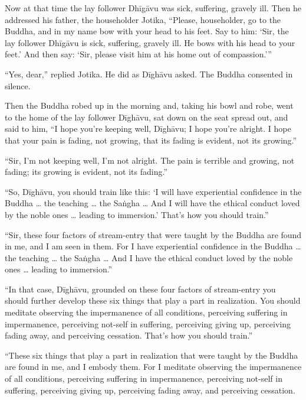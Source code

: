 \documentclass[12pt,openany]{book}%
\begin{document}
Now at that time the lay follower \textsanskrit{Dhīgāvu} was sick, suffering, gravely ill. Then he addressed his father, the householder Jotika, “Please, householder, go to the Buddha, and in my name bow with your head to his feet. Say to him: ‘Sir, the lay follower \textsanskrit{Dhīgāvu} is sick, suffering, gravely ill. He bows with his head to your feet.’ And then say: ‘Sir, please visit him at his home out of compassion.’” 

“Yes, dear,” replied Jotika. He did as \textsanskrit{Dīghāvu} asked. The Buddha consented in silence. 

Then the Buddha robed up in the morning and, taking his bowl and robe, went to the home of the lay follower \textsanskrit{Dīghāvu}, sat down on the seat spread out, and said to him, “I hope you’re keeping well, \textsanskrit{Dīghāvu}; I hope you’re alright. I hope that your pain is fading, not growing, that its fading is evident, not its growing.” 

“Sir, I’m not keeping well, I’m not alright. The pain is terrible and growing, not fading; its growing is evident, not its fading.” 

“So, \textsanskrit{Dīghāvu}, you should train like this: ‘I will have experiential confidence in the Buddha … the teaching … the \textsanskrit{Saṅgha} … And I will have the ethical conduct loved by the noble ones … leading to immersion.’ That’s how you should train.” 

“Sir, these four factors of stream-entry that were taught by the Buddha are found in me, and I am seen in them. For I have experiential confidence in the Buddha … the teaching … the \textsanskrit{Saṅgha} … And I have the ethical conduct loved by the noble ones … leading to immersion.” 

“In that case, \textsanskrit{Dīghāvu}, grounded on these four factors of stream-entry you should further develop these six things that play a part in realization. You should meditate observing the impermanence of all conditions, perceiving suffering in impermanence, perceiving not-self in suffering, perceiving giving up, perceiving fading away, and perceiving cessation. That’s how you should train.” 

“These six things that play a part in realization that were taught by the Buddha are found in me, and I embody them. For I meditate observing the impermanence of all conditions, perceiving suffering in impermanence, perceiving not-self in suffering, perceiving giving up, perceiving fading away, and perceiving cessation. 
\end{document}
